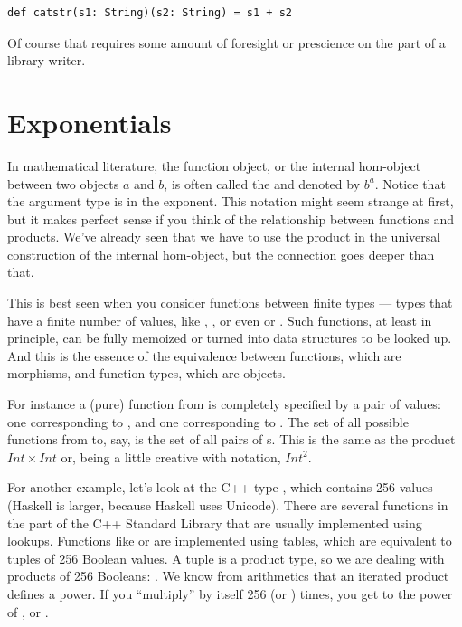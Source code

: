 \begin{Verbatim}
def catstr(s1: String)(s2: String) = s1 + s2
\end{Verbatim}
Of course that requires some amount of foresight or prescience on the
part of a library writer.

\section{Exponentials}

In mathematical literature, the function object, or the internal
hom-object between two objects $a$ and $b$, is often
called the  and denoted by $b^{a}$. Notice that
the argument type is in the exponent. This notation might seem strange
at first, but it makes perfect sense if you think of the relationship
between functions and products. We've already seen that we have to use
the product in the universal construction of the internal hom-object,
but the connection goes deeper than that.

This is best seen when you consider functions between finite types ---
types that have a finite number of values, like ,
, or even  or . Such functions,
at least in principle, can be fully memoized or turned into data
structures to be looked up. And this is the essence of the equivalence
between functions, which are morphisms, and function types, which are
objects.

For instance a (pure) function from  is completely
specified by a pair of values: one corresponding to , and
one corresponding to . The set of all possible functions
from  to, say,  is the set of all pairs of
s. This is the same as the product $Int \times Int$ or,
being a little creative with notation, $Int^{2}$.

For another example, let's look at the C++ type , which
contains 256 values (Haskell  is larger, because Haskell
uses Unicode). There are several functions in the part of the
C++ Standard Library that are usually implemented using lookups.
Functions like  or  are implemented
using tables, which are equivalent to tuples of 256 Boolean values. A
tuple is a product type, so we are dealing with products of 256
Booleans: . We know from
arithmetics that an iterated product defines a power. If you
``multiply''  by itself 256 (or ) times, you
get  to the power of , or .

